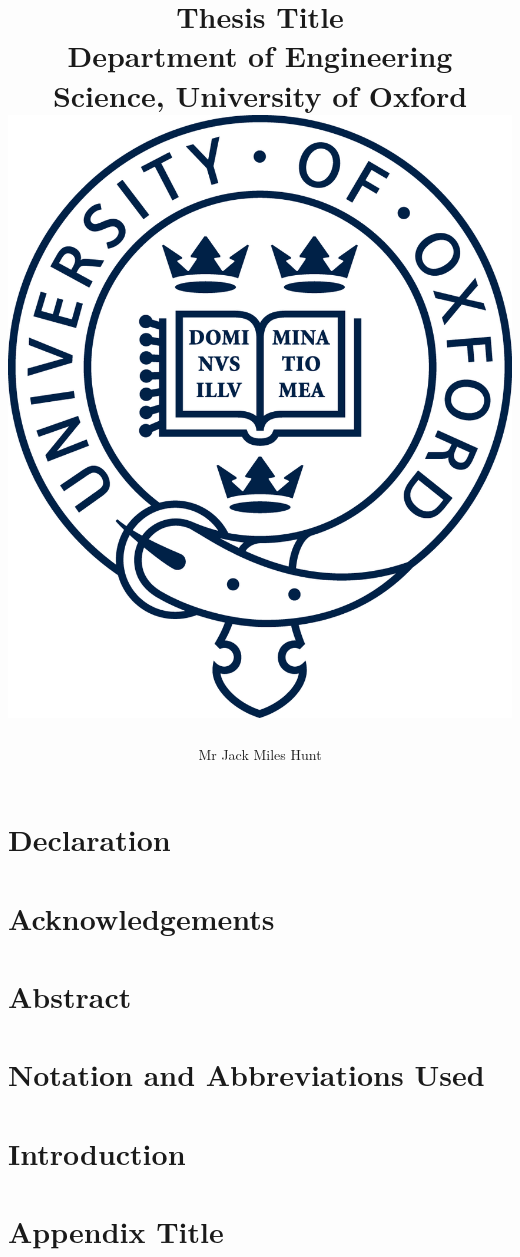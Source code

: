 \documentclass[12pt]{report}
\title{
    {Thesis Title}\\
    {\large Department of Engineering Science, University of Oxford}\\
    {\includegraphics[scale=0.3]{pre_chapters/figures/oxford_logo.png}}
}
\author{Mr Jack Miles Hunt}
\date{}
\begin{document}
\maketitle
\chapter*{Declaration}


\chapter*{Acknowledgements}


\chapter*{Abstract}


\chapter*{Notation and Abbreviations Used}


\tableofcontents
\listoffigures
\listoftables
\chapter{Introduction}


\appendix
\chapter{Appendix Title}

\appendix


\end{document}
